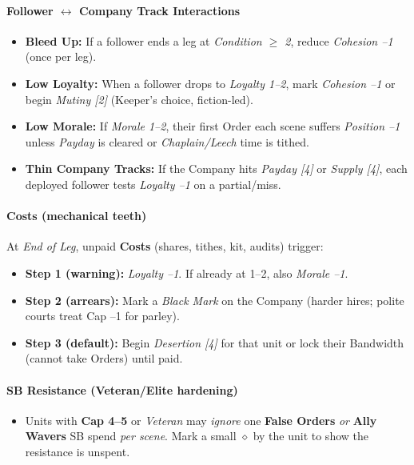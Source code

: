 \documentclass[11pt]{article}
\begin{document}
\paragraph{Follower \(\leftrightarrow\) Company Track Interactions}
\begin{itemize}[leftmargin=*]
  \item \textbf{Bleed Up:} If a follower ends a leg at \emph{Condition \(\ge\) 2}, reduce \emph{Cohesion --1} (once per leg).
  \item \textbf{Low Loyalty:} When a follower drops to \emph{Loyalty 1--2}, mark \emph{Cohesion --1} or begin \emph{Mutiny [2]} (Keeper's choice, fiction-led).
  \item \textbf{Low Morale:} If \emph{Morale 1--2}, their first Order each scene suffers \emph{Position --1} unless \emph{Payday} is cleared or \emph{Chaplain/Leech} time is tithed.
  \item \textbf{Thin Company Tracks:} If the Company hits \emph{Payday [4]} or \emph{Supply [4]}, each deployed follower tests \emph{Loyalty --1} on a partial/miss.
\end{itemize}

\paragraph{Costs (mechanical teeth)}
At \emph{End of Leg}, unpaid \textbf{Costs} (shares, tithes, kit, audits) trigger:
\begin{itemize}[leftmargin=*]
  \item \textbf{Step 1 (warning):} \emph{Loyalty --1}. If already at 1--2, also \emph{Morale --1}.
  \item \textbf{Step 2 (arrears):} Mark a \emph{Black Mark} on the Company (harder hires; polite courts treat Cap --1 for parley).
  \item \textbf{Step 3 (default):} Begin \emph{Desertion [4]} for that unit or lock their Bandwidth (cannot take Orders) until paid.
\end{itemize}

\paragraph{SB Resistance (Veteran/Elite hardening)}
\begin{itemize}[leftmargin=*]
  \item Units with \textbf{Cap 4--5} or \emph{Veteran} may \emph{ignore} one \textbf{False Orders} \emph{or} \textbf{Ally Wavers} SB spend \emph{per scene}. Mark a small \(\diamond\) by the unit to show the resistance is unspent.
\end{itemize}
\end{document}
